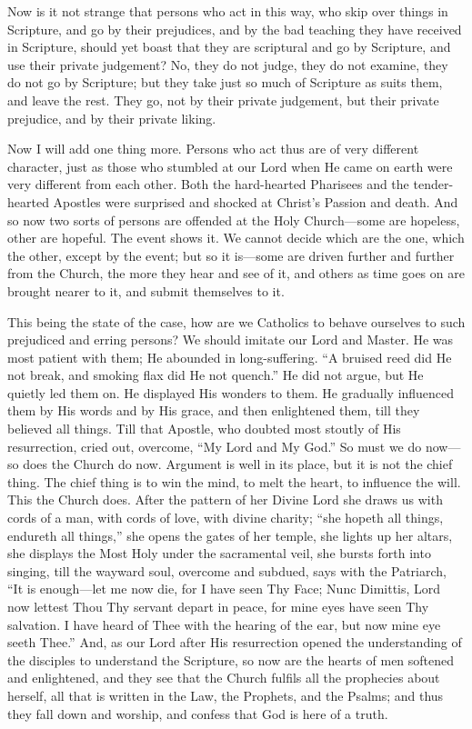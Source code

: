 Now is it not strange that persons who act in
this way, who skip over things in Scripture, and go by their
prejudices, and by the bad teaching they have received in Scripture,
should yet boast that they are scriptural and go by Scripture,
and use their private judgement? No, they do not judge, they do not
examine, they do not go by Scripture; but they take just so much of
Scripture as suits them, and leave the rest. They go, not by their
private judgement, but their private prejudice, and by their private
liking.

Now I will add one thing more. Persons who act
thus are of very different character, just as those who stumbled at
our Lord when He came on earth were very different from each other.
Both the hard-hearted Pharisees and the tender-hearted Apostles were
surprised and shocked at Christ's Passion and death. And so now two
sorts of persons are offended at the Holy Church—some are hopeless,
other are hopeful. The event shows it. We cannot decide which are the
one, which the other, except by the event; but so it is—some are
driven further and further from the Church, the more they hear and see
of it, and others as time goes on are brought nearer to it, and submit
themselves to it.

This being the state of the case, how are we
Catholics to behave ourselves to such prejudiced and erring persons?
We should imitate our Lord and Master. He was most patient with them;
He abounded in long-suffering. ``A bruised reed did He not break,
and smoking flax did He not quench.'' He did not argue, but He quietly
led them on. He displayed His wonders to them. He gradually influenced
them by His words and by His grace, and then enlightened them,
till they believed all things. Till that Apostle, who doubted most
stoutly of His resurrection, cried out, overcome, ``My Lord and My
God.'' So must we do now—so does the Church do now. Argument is well
in its place, but it is not the chief thing. The chief thing is to win
the mind, to melt the heart, to influence the will. This the Church
does. After the pattern of her Divine Lord she draws us with cords of
a man, with cords of love, with divine charity; ``she hopeth all
things, endureth all things,'' she opens the gates of her temple, she
lights up her altars, she displays the Most Holy under the sacramental
veil, she bursts forth into singing, till the wayward soul, overcome
and subdued, says with the Patriarch, ``It is enough—let me now die,
for I have seen Thy Face; Nunc Dimittis, Lord now lettest Thou Thy
servant depart in peace, for mine eyes have seen Thy salvation. I have
heard of Thee with the hearing of the ear, but now mine eye seeth
Thee.'' And, as our Lord after His resurrection opened the
understanding of the disciples to understand the Scripture, so now are
the hearts of men softened and enlightened, and they see that the
Church fulfils all the prophecies about herself, all that is written
in the Law, the Prophets, and the Psalms; and thus they fall down and
worship, and confess that God is here of a truth.

